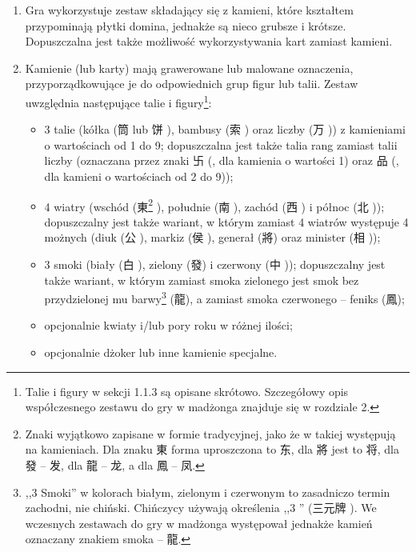 \begin{enumerate}[label={\alph*)}] \item Gra wykorzystuje zestaw składający się
z kamieni, które kształtem przypominają płytki domina, jednakże są nieco grubsze
i krótsze. Dopuszczalna jest także możliwość wykorzystywania kart zamiast
kamieni.
\item Kamienie (lub karty) mają grawerowane lub malowane oznaczenia,
przyporządkowujące je do odpowiednich grup figur lub talii. Zestaw uwzględnia
następujące talie i figury\footnote{Talie i figury w sekcji 1.1.3 są opisane
skrótowo. Szczegółowy opis współczesnego zestawu do gry w madżonga znajduje się
w rozdziale 2.}:
	\begin{itemize}
	  \item 3 talie (kółka (筒  lub 饼 ), bambusy (索
	  ) oraz liczby (万 )) z kamieniami o
wartościach od 1 do 9; dopuszczalna jest także talia rang zamiast talii liczby
(oznaczana przez znaki 卐 (, dla kamienia o wartości 1) oraz 品 
(, dla kamieni o wartościach od 2 do 9)); \item 4 wiatry  (wschód
(東\footnote{\label{definicja_tradycyjne} Znaki wyjątkowo zapisane w formie
tradycyjnej, jako że w takiej występują na kamieniach. Dla znaku 東  forma
uproszczona to 东, dla 將 jest to 将, dla 發 -- 发, dla 龍 -- 龙, a dla 鳳 -- 凤.} 
), południe (南 ), zachód (西 ) i północ (北
));  dopuszczalny jest także wariant, w którym zamiast 4 wiatrów
występuje 4 możnych (diuk (公 ),  markiz (侯 ),  generał
(將\footnotemark[2] ) oraz minister (相 ));
	  \item 3 smoki (biały (白 ), zielony (發\footnotemark[2]
	  ) i czerwony (中 )); dopuszczalny jest także wariant,
	  w którym zamiast smoka zielonego jest smok bez przydzielonej mu
	  barwy\footnote{,,3 Smoki'' w kolorach białym, zielonym i czerwonym to
	  zasadniczo termin zachodni, nie chiński.
	  Chińczycy używają określenia ,,3 '' (三元牌 ). We wczesnych zestawach do gry w madżonga występował jednakże
	  kamień oznaczany znakiem smoka -- 龍\footnotemark[2].} (龍\footnotemark[2]
	  ), a zamiast smoka czerwonego -- feniks (鳳\footnotemark[2] );
	  \item opcjonalnie kwiaty i/lub pory roku w różnej ilości;
	  \item opcjonalnie dżoker lub inne kamienie specjalne.

\end{itemize}
\end{enumerate}
